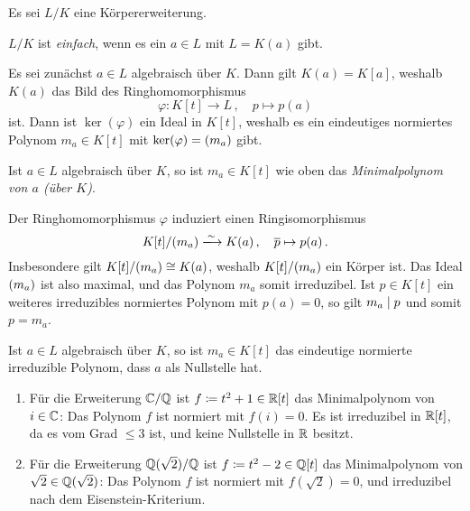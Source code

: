 Es sei $L/K$ eine Körpererweiterung.

\begin{definition}
  $L/K$ ist \emph{einfach}, wenn es ein $a \in L$ mit $L = K(a)$ gibt.
\end{definition}

Es sei zunächst $a \in L$ algebraisch über $K$.
Dann gilt $K(a) = K[a]$, weshalb $K(a)$ das Bild des Ringhomomorphismus
\[
          \varphi
  \colon  K[t]
  \to     L \,,
  \quad   p
  \mapsto p(a)
\]
ist.
Dann ist $\ker(\varphi)$ ein Ideal in $K[t]$, weshalb es ein eindeutiges normiertes Polynom $m_a \in K[t]$ mit $\ker(\varphi) = (m_a)$ gibt.

\begin{definition}
  Ist $a \in L$ algebraisch über $K$, so ist $m_a \in K[t]$ wie oben das \emph{Minimalpolynom von $a$ \textup(über $K$\textup)}.
\end{definition}

Der Ringhomomorphismus $\varphi$ induziert einen Ringisomorphismus
\[
                          K[t]/\genideal{m_a}
  \xlongrightarrow{\sim}  K(a) \,,
  \quad                   \class{p}
  \mapsto                 p(a) \,.
\]
Insbesondere gilt $K[t]/(m_a) \cong K(a)$, weshalb $K[t]/(m_a)$ ein Körper ist.
Das Ideal $(m_a)$ ist also maximal, und das Polynom $m_a$ somit irreduzibel.
Ist $p \in K[t]$ ein weiteres irreduzibles normiertes Polynom mit $p(a) = 0$, so gilt $m_a \mathrel{|} p$ und somit $p = m_a$.

\begin{corollary}
  Ist $a \in L$ algebraisch über $K$, so ist $m_a \in K[t]$ das eindeutige normierte irreduzible Polynom, dass $a$ als Nullstelle hat.
\end{corollary}

\begin{example}
  \label{example: minimal polynomials}
  \begin{enumerate}
    \item
      Für die Erweiterung $\mathbb{C}/\mathbb{Q}$ ist $f \coloneqq t^2 + 1 \in \mathbb{R}[t]$ das Minimalpolynom von $i \in \mathbb{C}$:
      Das Polynom $f$ ist normiert mit $f(i) = 0$.
      Es ist irreduzibel in $\mathbb{R}[t]$, da es vom Grad $\leq 3$ ist, und keine Nullstelle in $\mathbb{R}$ besitzt.
    \item
      Für die Erweiterung $\mathbb{Q}(\sqrt{2})/\mathbb{Q}$ ist $f \coloneqq t^2 - 2 \in \mathbb{Q}[t]$ das Minimalpolynom von $\sqrt{2} \in \mathbb{Q}(\sqrt{2})$:
      Das Polynom $f$ ist normiert mit $f(\sqrt{2}) = 0$, und irreduzibel nach dem Eisenstein-Kriterium.
  \end{enumerate}
\end{example}

